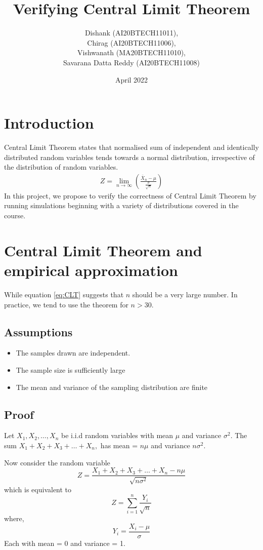\documentclass{article}
\title{Verifying Central Limit Theorem}
\author{Dishank (AI20BTECH11011),\\ Chirag (AI20BTECH11006),\\ Vishwanath (MA20BTECH11010),\\ Savarana Datta Reddy (AI20BTECH11008)}
\date{April 2022}
\begin{document}
\maketitle

\section{Introduction}
Central Limit Theorem states that normalised sum of independent and identically distributed random variables tends towards a normal distribution, irrespective of the distribution of random variables.
\begin{align}
    Z = \lim_{n \to \infty} \left(\frac{\bar{X}_n-\mu}{\frac{\sigma}{\sqrt{n}}}\right) \label{eq:CLT}
\end{align}
In this project, we propose to verify the correctness of Central Limit Theorem by running simulations beginning with a variety of distributions covered in the course.

\section{Central Limit Theorem and empirical approximation}
While equation \eqref{eq:CLT} suggests that $n$ should be a very large number. In practice, we tend to use the theorem for $n>30$. 
\subsection{Assumptions}
\begin{itemize}
\item  The samples drawn are independent.
\item  The sample size is sufficiently large
\item  The mean and variance of the sampling distribution are finite
\end{itemize}
\subsection{Proof}
Let $X_1,X_2,\dots,X_n$ be i.i.d random variables with mean $\mu$ and variance $\sigma^2$.
The sum $X_1+X_2+X_3+\dots+X_n,$ has mean = $n\mu$ and variance $n\sigma^2$.

Now consider the random variable 
\begin{equation}
    Z = \frac{X_1+X_2+X_3+\dots+X_n - n\mu}{\sqrt{n\sigma^2}}
\end{equation}
which is equivalent to 
\begin{equation}
    Z = \sum_{i=1}^n \frac{Y_i}{\sqrt{n}}
\end{equation}
where,
\begin{equation}
    Y_i = \frac{X_i-\mu}{\sigma}\label{a}
\end{equation}
Each with mean = 0 and variance = 1.
\end{document}
